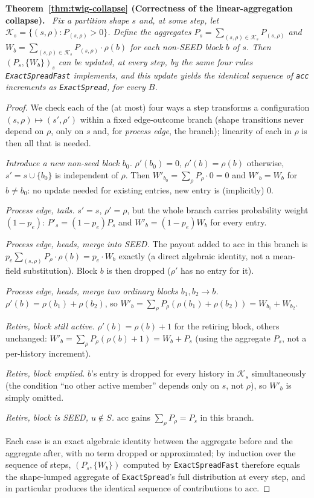 \documentclass[preprint,11pt]{elsarticle}
\theoremstyle{definition}
\theoremstyle{remark}
\newenvironment{repeattheorem}[1][]{\par\medskip\noindent\textbf{#1.}\ \itshape}{\par\medskip}
\begin{document}
\begin{repeattheorem}[Theorem~\ref{thm:twig-collapse} (Correctness of the linear-aggregation collapse)]
Fix a partition shape $s$ and, at some step, let
$\mathcal K_s=\{(s,\rho):P_{(s,\rho)}>0\}$. Define the aggregates
$P_s=\sum_{(s,\rho)\in\mathcal K_s}P_{(s,\rho)}$ and
$W_b=\sum_{(s,\rho)\in\mathcal K_s}P_{(s,\rho)}\cdot\rho(b)$ for each
non-SEED block $b$ of $s$. Then $(P_s,\{W_b\})_s$ can be updated, at every
step, by the same four rules \texttt{ExactSpreadFast} implements, and this
update yields the identical sequence of \texttt{acc} increments as
\texttt{ExactSpread}, for every $B$.
\end{repeattheorem}
\begin{proof}
We check each of the (at most) four ways a step transforms a configuration
$(s,\rho)\mapsto(s',\rho')$ within a fixed edge-outcome branch (shape
transitions never depend on $\rho$, only on $s$ and, for
\emph{process edge}, the branch); linearity of each in $\rho$ is then
all that is needed.

\emph{Introduce a new non-seed block $b_0$.} $\rho'(b_0)=0$,
$\rho'(b)=\rho(b)$ otherwise, $s'=s\cup\{b_0\}$ is independent of $\rho$.
Then $W'_{b_0}=\sum_\rho P_\rho\cdot 0=0$ and $W'_b=W_b$ for $b\ne b_0$: no
update needed for existing entries, new entry is (implicitly) $0$.

\emph{Process edge, tails.} $s'=s$, $\rho'=\rho$, but the whole branch
carries probability weight $(1-p_e)$: $P'_s=(1-p_e)P_s$ and
$W'_b=(1-p_e)W_b$ for every entry.

\emph{Process edge, heads, merge into SEED.} The payout added to
$\mathrm{acc}$ in this branch is
$p_e\sum_{(s,\rho)}P_\rho\cdot\rho(b)=p_e\cdot W_b$ exactly (a direct
algebraic identity, not a mean-field substitution). Block $b$ is then
dropped ($\rho'$ has no entry for it).

\emph{Process edge, heads, merge two ordinary blocks $b_1,b_2\to b$.}
$\rho'(b)=\rho(b_1)+\rho(b_2)$, so
$W'_b=\sum_\rho P_\rho(\rho(b_1)+\rho(b_2))=W_{b_1}+W_{b_2}$.

\emph{Retire, block still active.} $\rho'(b)=\rho(b)+1$ for the retiring
block, others unchanged: $W'_b=\sum_\rho P_\rho(\rho(b)+1)=W_b+P_s$ (using
the aggregate $P_s$, not a per-history increment).

\emph{Retire, block emptied.} $b$'s entry is dropped for every history in
$\mathcal K_s$ simultaneously (the condition ``no other active member''
depends only on $s$, not $\rho$), so $W'_b$ is simply omitted.

\emph{Retire, block is SEED, $u\notin S$.} $\mathrm{acc}$ gains
$\sum_\rho P_\rho=P_s$ in this branch.

Each case is an exact algebraic identity between the aggregate before and
the aggregate after, with no term dropped or approximated; by induction
over the sequence of steps, $(P_s,\{W_b\})$ computed by
\texttt{ExactSpreadFast} therefore equals the shape-lumped aggregate of
\texttt{ExactSpread}'s full distribution at every step, and in particular
produces the identical sequence of contributions to $\mathrm{acc}$.
\end{proof}
\end{document}
